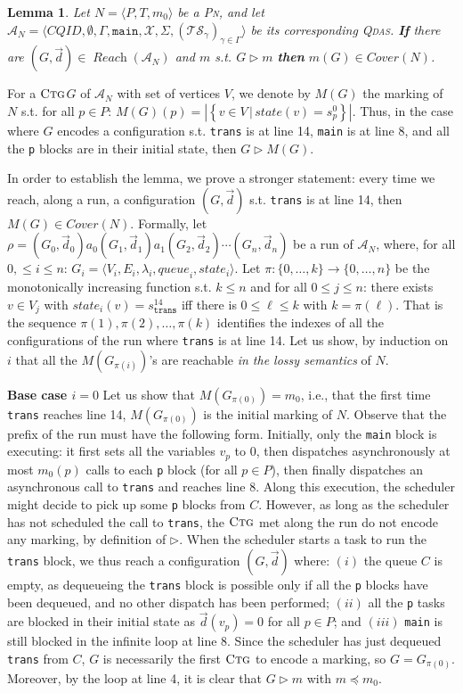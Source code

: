 \documentclass[runningheads,oribibl,]{article}
\newcommand{\mleq}{\preceq}
\newcommand{\tuple}[1]{\langle#1\rangle\xspace}
\newcommand{\set}[2]{\left\{#1\,\vert\,#2\right\}}
\newcommand{\Aa}{\ensuremath{\mathcal{A}}\xspace}
\newcommand{\Ts}{\ensuremath{\mathcal{TS}}\xspace}
\newcommand{\Xx}{\ensuremath{\mathcal{X}}\xspace}
\newcommand{\CQID}{CQID\xspace}
\newcommand{\pn}{\textsc{Pn}\xspace}
\newcommand{\qdas}{\textsc{Qdas}\xspace}
\DeclareMathOperator{\Reach}{\textit{Reach}}
\newcommand{\Cover}{\ensuremath{\textit{Cover}}}
\newcommand{\Reachloss}{\Cover}
\newcommand{\Data}{\ensuremath{\vec{d}}}
\newcommand{\queue}{\ensuremath{\textit{queue}}}
\newcommand{\state}{\ensuremath{\textit{state}}}
\newcommand{\ctg}{\ensuremath{\textsc{Ctg}}\xspace}
\newcommand{\mystate}[2]{\ensuremath{s^{#1}_{\mathtt{#2}}}}
\newtheorem{lemma}{Lemma}{}
\newenvironment{proof}{\noindent{\it Proof.\hspace*{.5cm}}}{}
\begin{document}
\begin{lemma}
  Let $N=\tuple{P,T,m_0}$ be a \pn, and let $\Aa_N=\tuple{\CQID,
    \emptyset, \Gamma, \mathtt{main}, \Xx, \Sigma,
    (\Ts_\gamma)_{\gamma\in\Gamma}}$ be its corresponding \qdas.
  \textbf{If} there are $(G,\Data)\in\Reach(\Aa_N)$ and $m$
  s.t. $G\rhd m$ \textbf{then} $m(G)\in\Reachloss(N)$.
\end{lemma}
\begin{proof}
  For a \ctg $G$ of $\Aa_N$ with set of vertices $V$, we denote by
  $M(G)$ the marking of $N$ s.t. for all $p\in P$: $M(G)(p)=|\set{v\in
    V}{\state(v)=s^0_p}|$. Thus, in the case where $G$ encodes a
  configuration s.t. \texttt{trans} is at line 14, \texttt{main} is at
  line 8, and all the \texttt{p} blocks are in their initial state,
  then $G\rhd M(G)$.

  In order to establish the lemma, we prove a stronger statement:
  every time we reach, along a run, a configuration $(G,\Data)$
  s.t. \texttt{trans} is at line 14, then $M(G)\in\Reachloss(N)$.
  Formally, let
  $\rho=(G_0,\Data_0)a_0(G_1,\Data_1)a_1(G_2,\Data_2)\cdots(G_n,\Data_n)$
  be a run of $\Aa_N$, where, for all $0,\leq i\leq n$:
  $G_i=\tuple{V_i,E_i,\lambda_i,\queue_i,\state_i}$. Let
  $\pi:\{0,\ldots, k\}\rightarrow \{0,\ldots,n\}$ be the monotonically
  increasing function s.t. $k\leq n$ and for all $0\leq j\leq n$:
  there exists $v\in V_j$ with $\state_i(v)=\mystate{14}{trans}$ iff
  there is $0\leq \ell\leq k$ with $k=\pi(\ell)$.  That is the
  sequence $\pi(1), \pi(2),\ldots, \pi(k)$ identifies the indexes of
  all the configurations of the run where \texttt{trans} is at line
  14. Let us show, by induction on $i$ that all the $M(G_{\pi(i)})$'s
  are reachable \emph{in the lossy semantics} of $N$.

  \textbf{Base case $i=0$} Let us show that $M(G_{\pi(0)})=m_0$, i.e.,
  that the first time \texttt{trans} reaches line 14, $M(G_{\pi(0)})$
  is the initial marking of $N$. Observe that the prefix of the run
  must have the following form. Initially, only the \texttt{main} block
  is executing: it first sets all the variables $v_p$ to $0$, then
  dispatches asynchronously at most $m_0(p)$ calls to each \texttt{p}
  block (for all $p\in P$), then finally dispatches an asynchronous
  call to \texttt{trans} and reaches line 8. Along this execution, the
  scheduler might decide to pick up some \texttt{p} blocks from
  $C$. However, as long as the scheduler has not scheduled the call to
  \texttt{trans}, the \ctg met along the run do not encode any
  marking, by definition of $\rhd$. When the scheduler starts a task
  to run the \texttt{trans} block, we thus reach a configuration
  $(G,\Data)$ where: $(i)$ the queue $C$ is empty, as dequeueing the
  \texttt{trans} block is possible only if all the \texttt{p} blocks
  have been dequeued, and no other dispatch has been performed; $(ii)$
  all the \texttt{p} tasks are blocked in their initial state as
  $\Data(v_p)=0$ for all $p\in P$; and $(iii)$ \texttt{main} is still
  blocked in the infinite loop at line $8$. Since the scheduler has
  just dequeued \texttt{trans} from $C$, $G$ is necessarily the first
  \ctg to encode a marking, so $G=G_{\pi(0)}$. Moreover, by the loop
  at line 4, it is clear that $G\rhd m$ with $m\mleq m_0$.


\end{proof}
\end{document}
